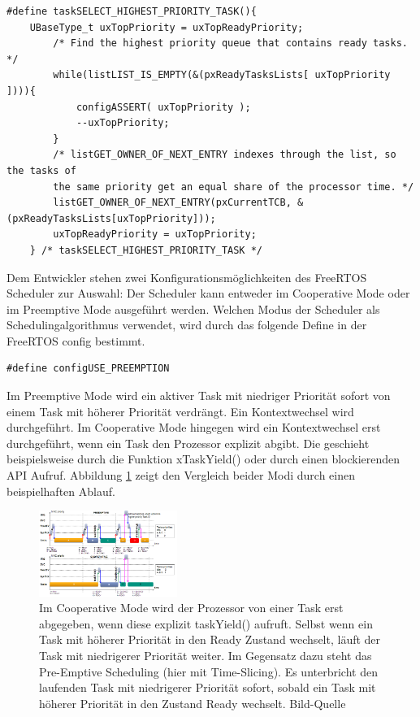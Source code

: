 \begin{lstlisting}[caption={FreeRTOS Source zur Priroty Task Selection aus Task.c. Alle lauffähigen Tasks werden in einem Array verwaltet pxReadyTaskLists. Die Listen verwalten sich durch Referenz-Pointer in den TCBs der einzelnen Tasks}, linewidth=8cm,captionpos=b, label=lst:nextTask, float=hbt]
#define taskSELECT_HIGHEST_PRIORITY_TASK(){																									
	UBaseType_t uxTopPriority = uxTopReadyPriority;														
		/* Find the highest priority queue that contains ready tasks. */								
		while(listLIST_IS_EMPTY(&(pxReadyTasksLists[ uxTopPriority ]))){																								
			configASSERT( uxTopPriority );																
			--uxTopPriority;																			
		}																								
		/* listGET_OWNER_OF_NEXT_ENTRY indexes through the list, so the tasks of						
		the	same priority get an equal share of the processor time. */									
		listGET_OWNER_OF_NEXT_ENTRY(pxCurrentTCB, &(pxReadyTasksLists[uxTopPriority]));			
		uxTopReadyPriority = uxTopPriority;																
	} /* taskSELECT_HIGHEST_PRIORITY_TASK */
\end{lstlisting}
Dem Entwickler stehen zwei Konfigurationsmöglichkeiten des FreeRTOS Scheduler zur Auswahl: Der Scheduler kann entweder im Cooperative Mode oder im Preemptive Mode ausgeführt werden. Welchen Modus der Scheduler als Schedulingalgorithmus verwendet, wird durch das folgende Define in der FreeRTOS config bestimmt.
\begin{lstlisting}[numbers = none]
#define configUSE_PREEMPTION
\end{lstlisting}
Im Preemptive Mode wird ein aktiver Task mit niedriger Priorität sofort von einem Task mit höherer Priorität verdrängt. Ein Kontextwechsel wird durchgeführt. Im Cooperative Mode hingegen wird ein Kontextwechsel erst durchgeführt, wenn ein Task den Prozessor explizit abgibt. Die geschieht beispielsweise durch die Funktion xTaskYield() oder durch einen blockierenden API Aufruf. Abbildung \ref{fig:PreVSCo} zeigt den Vergleich beider Modi durch einen beispielhaften Ablauf. 
\begin{figure}[htb]
	\centering
		\includegraphics[width=0.4\textwidth]{Pictures/EMCUIT/PreemptiveCooperative.png}
	\caption{Im Cooperative Mode wird der Prozessor von einer Task erst abgegeben, wenn diese explizit taskYield() aufruft. Selbst wenn ein Task mit höherer Priorität in den Ready Zustand wechselt, läuft der Task mit niedrigerer Priorität weiter. Im Gegensatz dazu steht das Pre-Emptive Scheduling (hier mit Time-Slicing). Es unterbricht den laufenden Task mit niedrigerer Priorität sofort, sobald ein Task mit höherer Priorität in den Zustand Ready wechselt. Bild-Quelle~\protect{}}
	\label{fig:PreVSCo}
\end{figure}
